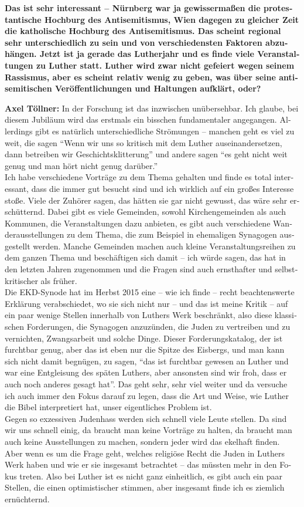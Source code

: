 \begin{otherlanguage}{ngerman}
\textbf{Das ist sehr interessant – Nürnberg war ja gewissermaßen die protestantische Hochburg des Antisemitismus, Wien dagegen zu gleicher Zeit die katholische Hochburg des Antisemitismus. Das scheint regional sehr unterschiedlich zu sein und von verschiedensten Faktoren abzuhängen. 
Jetzt ist ja gerade das Lutherjahr und es finde viele Veranstaltungen zu Luther statt. Luther wird zwar nicht gefeiert wegen seinem Rassismus, aber es scheint relativ wenig zu geben, was über seine antisemitischen Veröffentlichungen und Haltungen aufklärt, oder?} 

\textbf{Axel Töllner:} In der Forschung ist das inzwischen unübersehbar. Ich glaube, bei diesem Jubiläum wird das erstmals ein bisschen fundamentaler angegangen. Allerdings gibt es natürlich unterschiedliche Strömungen – manchen geht es viel zu weit, die sagen "`Wenn wir uns so kritisch mit dem Luther auseinandersetzen, dann betreiben wir Geschichtsklitterung"' und andere sagen "`es geht nicht weit genug und man hört nicht genug darüber."'\\ 
Ich habe verschiedene Vorträge zu dem Thema gehalten und finde es total interessant, dass die immer gut besucht sind und ich wirklich auf ein großes Interesse stoße. Viele der Zuhörer sagen, das hätten sie gar nicht gewusst, das wäre sehr erschütternd. Dabei gibt es viele Gemeinden, sowohl Kirchengemeinden als auch Kommunen, die Veranstaltungen dazu anbieten, es gibt auch verschiedene Wanderausstellungen zu dem Thema, die zum Beispiel in ehemaligen Synagogen ausgestellt werden. Manche Gemeinden machen auch kleine Veranstaltungsreihen zu dem ganzen Thema und beschäftigen sich damit – ich würde sagen, das hat in den letzten Jahren zugenommen und die Fragen sind auch ernsthafter und selbstkritischer als früher.\\  
Die EKD-Synode hat im Herbst 2015 eine – wie ich finde – recht beachtenswerte Erklärung verabschiedet, wo sie sich nicht nur – und das ist meine Kritik – auf ein paar wenige Stellen innerhalb von Luthers Werk beschränkt, also diese klassischen Forderungen, die Synagogen anzuzünden, die Juden zu vertreiben und zu vernichten, Zwangsarbeit und solche Dinge. Dieser Forderungskatalog, der ist furchtbar genug, aber das ist eben nur die Spitze des Eisbergs, und man kann sich nicht damit begnügen, zu sagen, "`das ist furchtbar gewesen an Luther und war eine Entgleisung des späten Luthers, aber ansonsten sind wir froh, dass er auch noch anderes gesagt hat"'. Das geht sehr, sehr viel weiter und da versuche ich auch immer den Fokus darauf zu legen, dass die Art und Weise, wie Luther die Bibel interpretiert hat, unser eigentliches Problem ist.\\ 
Gegen so exzessiven Judenhass werden sich schnell viele Leute stellen. Da sind wir uns schnell einig, da braucht man keine Vorträge zu halten, da braucht man auch keine Ausstellungen zu machen, sondern jeder wird das ekelhaft finden. Aber wenn es um die Frage geht, welches religiöse Recht die Juden in Luthers Werk haben und wie er sie insgesamt betrachtet – das müssten mehr in den Fokus treten. Also bei Luther ist es nicht ganz einheitlich, es gibt auch ein paar Stellen, die einen optimistischer stimmen, aber insgesamt finde ich es ziemlich ernüchternd. 
 

\end{otherlanguage}
